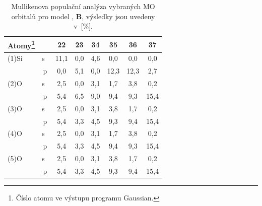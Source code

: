 \documentclass[
digital, %
table,   %
nolof,     %
nolot,     %
oneside,
]{fithesis3}
\begin{document}
\begin{table}[H] \begin{minipage}{\textwidth}
\caption{Mullikenova populační analýza vybraných MO orbitalů pro model , \textbf{B}, výsledky jsou uvedeny v~[\%].}
\begin{center}
\begin{tabular}{|l|c|c|c|c|c|c|c|}
\hline
Atomy\footnote{Číslo atomu ve výstupu programu Gaussian.}\label{si_och3_4_MPA} &  & 22 & 23 & 34 & 35 & 36 & 37 \\ \hline
(1)Si & s~& 11,1  & 0,0  & 4,6  & 0,0  & 0,0  & 0,0  \\ \hline
& p & 0,0  & 5,1  & 0,0  & 12,3  & 12,3  & 2,7  \\ \hline
(2)O& s~& 2,5  & 0,0  & 3,1  & 1,7  & 3,8  & 0,2  \\ \hline
& p & 5,4  & 6,5  & 9,0  & 9,4  & 9,3  & 15,4  \\ \hline
(3)O & s~& 2,5  & 0,0  & 3,1  & 3,8  & 1,7  & 0,2  \\ \hline
& p & 5,4  & 3,3  & 4,5  & 9,3  & 9,4  & 15,4  \\ \hline
(4)O & s~& 2,5  & 0,0  & 3,1  & 1,7  & 3,8  & 0,2  \\ \hline
& p & 5,4  & 3,3  & 4,5  & 9,4  & 9,3  & 15,4  \\ \hline
(5)O & s~& 2,5  & 0,0  & 3,1  & 3,8  & 1,7  & 0,2  \\ \hline
& p & 5,4  & 3,3  & 4,5  & 9,3  & 9,4  & 15,4  \\ \hline
\end{tabular}
\end{center}
\end{minipage}
\end{table}
\end{document}
